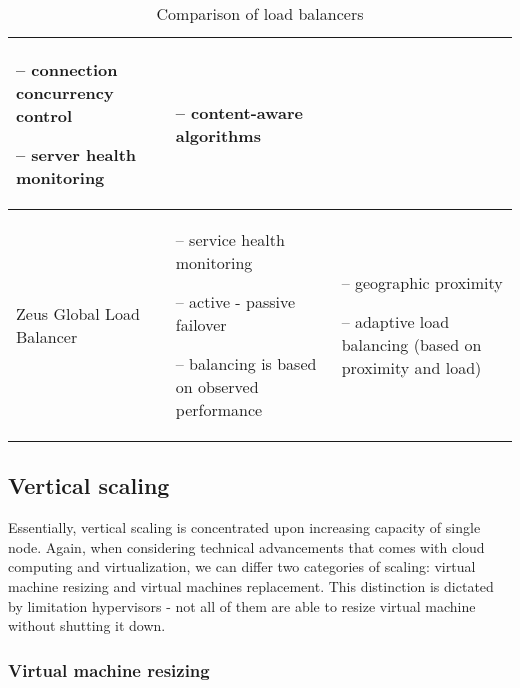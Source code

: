 \begin{table}[!htbp]
\begin{tabularx}{\textwidth}[]{ X  X  X }
-- connection concurrency control

-- server health monitoring

& 
-- content-aware algorithms
\\ \hline

Zeus Global Load Balancer \cite{ZeusGlobal} & 

-- service health monitoring

-- active - passive failover

-- balancing is based on observed performance

& 
-- geographic proximity

-- adaptive load balancing (based on proximity and load)

\\ \hline

\end{tabularx}

\caption{Comparison of load balancers}
\label{tab:load-balancer-comparison}

\end{table}

\newpage
\subsection{Vertical scaling}
Essentially, vertical scaling is concentrated upon increasing capacity of single node. Again, when considering technical advancements that comes with cloud computing and virtualization, we can differ two categories of scaling: virtual machine resizing and virtual machines replacement. This distinction is dictated by limitation hypervisors - not all of them are able to resize virtual machine without shutting it down.

\subsubsection{Virtual machine resizing}


